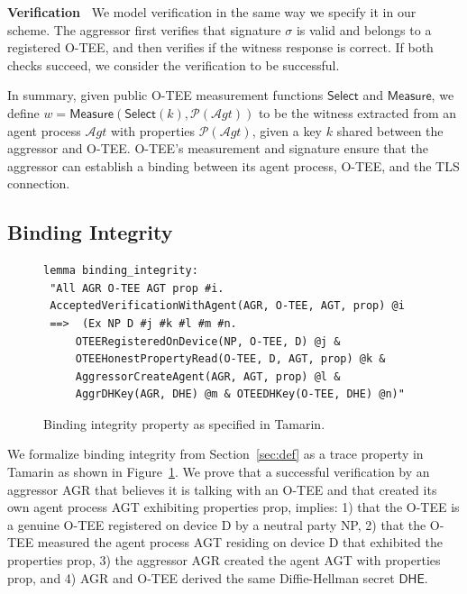 \documentclass[letterpaper,twocolumn,10pt]{article}
\newcommand{\agent}{\ensuremath{\mathcal{A}gt}\xspace}
\newcommand{\mypara}[1]{\vspace{.5em}\noindent\textbf{{#1}~}}
\begin{document}
\mypara{Verification}
We model verification in the same way we specify it in our scheme. The aggressor first verifies that
signature $\sigma$ is valid and belongs to a registered O-TEE, and then verifies if the witness
response is correct. If both checks succeed, we consider the verification to be successful.

In summary, given public O-TEE measurement functions $\mathsf{Select}$ and $\mathsf{Measure}$, we define
$w = \mathsf{Measure}(\mathsf{Select}(k), \mathcal{P}(\agent))$ to be the witness extracted from an agent
process $\agent$ with properties $\mathcal{P}(\agent)$, given a key $k$ shared between the aggressor and O-TEE.
O-TEE's measurement and signature ensure that the aggressor can establish a binding between
its agent process, O-TEE, and the TLS connection.

\subsection{Binding Integrity}
%

\begin{figure}
    \centering

    \begin{lstlisting}[frame=single, basicstyle=\scriptsize\ttfamily]
lemma binding_integrity:
 "All AGR O-TEE AGT prop #i.
 AcceptedVerificationWithAgent(AGR, O-TEE, AGT, prop) @i
 ==>  (Ex NP D #j #k #l #m #n.
     OTEERegisteredOnDevice(NP, O-TEE, D) @j &
     OTEEHonestPropertyRead(O-TEE, D, AGT, prop) @k &
     AggressorCreateAgent(AGR, AGT, prop) @l &
     AggrDHKey(AGR, DHE) @m & OTEEDHKey(O-TEE, DHE) @n)"
    \end{lstlisting}

    \caption{Binding integrity property as specified in Tamarin.}
    \label{fig:binding-integrity}
\end{figure}

We formalize binding integrity from Section~\ref{sec:def} as a trace property in Tamarin as shown in Figure~\ref{fig:binding-integrity}.
We prove that a successful verification by an aggressor \textsf{AGR} that believes it is talking with an \textsf{O-TEE} and that created its own agent process \textsf{AGT} exhibiting properties \textsf{prop}, implies: 1) that the \textsf{O-TEE} is a genuine O-TEE registered on device \textsf{D} by a neutral party \textsf{NP}, 2) that the \textsf{O-TEE} measured the agent process \textsf{AGT} residing on device \textsf{D} that exhibited the properties \textsf{prop}, 3) the aggressor \textsf{AGR} created the agent \textsf{AGT} with properties \textsf{prop}, and 4) \textsf{AGR} and \textsf{O-TEE} derived the same Diffie-Hellman secret $\textsf{DHE}$.
\end{document}
